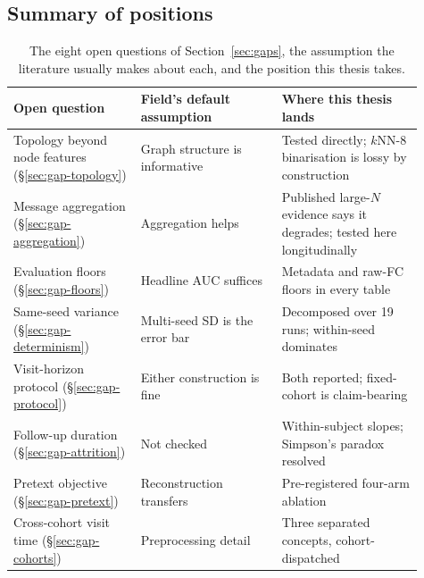 \subsection{Summary of positions}

\begin{table}[htbp]
  \centering
  \small
  \begin{tabular}{@{}p{0.29\linewidth}p{0.31\linewidth}p{0.31\linewidth}@{}}
    \toprule
    \textbf{Open question} & \textbf{Field's default assumption} & \textbf{Where this thesis lands} \\
    \midrule
    Topology beyond node features (\S\ref{sec:gap-topology})
      & Graph structure is informative
      & Tested directly; $k$NN-8 binarisation is lossy by construction \\
    Message aggregation (\S\ref{sec:gap-aggregation})
      & Aggregation helps
      & Published large-$N$ evidence says it degrades; tested here longitudinally \\
    Evaluation floors (\S\ref{sec:gap-floors})
      & Headline AUC suffices
      & Metadata and raw-FC floors in every table \\
    Same-seed variance (\S\ref{sec:gap-determinism})
      & Multi-seed SD is the error bar
      & Decomposed over 19 runs; within-seed dominates \\
    Visit-horizon protocol (\S\ref{sec:gap-protocol})
      & Either construction is fine
      & Both reported; fixed-cohort is claim-bearing \\
    Follow-up duration (\S\ref{sec:gap-attrition})
      & Not checked
      & Within-subject slopes; Simpson's paradox resolved \\
    Pretext objective (\S\ref{sec:gap-pretext})
      & Reconstruction transfers
      & Pre-registered four-arm ablation \\
    Cross-cohort visit time (\S\ref{sec:gap-cohorts})
      & Preprocessing detail
      & Three separated concepts, cohort-dispatched \\
    \bottomrule
  \end{tabular}
  \caption{The eight open questions of Section~\ref{sec:gaps}, the assumption the
    literature usually makes about each, and the position this thesis takes.}
  \label{tab:gap-summary}
\end{table}
